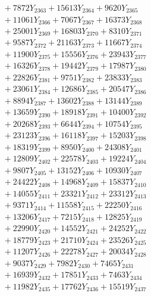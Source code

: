 \documentclass[a4paper,10pt]{article}
\begin{document}
{\begin{align}
&\;  + 7872 Y_{2363} + 15613 Y_{2364} + 9620 Y_{2365} \\[0.3ex]
&\;  + 11061 Y_{2366} + 7067 Y_{2367} + 16373 Y_{2368} \\[0.5ex]\allowbreak
&\;  + 25001 Y_{2369} + 16803 Y_{2370} + 8310 Y_{2371} \\[0.3ex]
&\;  + 9587 Y_{2372} + 21163 Y_{2373} + 11667 Y_{2374} \\[0.3ex]
&\;  + 11900 Y_{2375} + 15556 Y_{2376} + 23943 Y_{2377} \\[0.3ex]
&\;  + 16326 Y_{2378} + 19442 Y_{2379} + 17987 Y_{2380} \\[0.3ex]
&\;  + 22826 Y_{2381} + 9751 Y_{2382} + 23833 Y_{2383} \\[0.3ex]
&\;  + 23061 Y_{2384} + 12686 Y_{2385} + 20547 Y_{2386} \\[0.3ex]
&\;  + 8894 Y_{2387} + 13602 Y_{2388} + 13144 Y_{2389} \\[0.3ex]
&\;  + 13659 Y_{2390} + 18918 Y_{2391} + 10400 Y_{2392} \\[0.3ex]
&\;  + 20268 Y_{2393} + 6644 Y_{2394} + 10754 Y_{2395} \\[0.3ex]
&\;  + 23123 Y_{2396} + 16118 Y_{2397} + 15203 Y_{2398} \\[0.5ex]\allowbreak
&\;  + 18319 Y_{2399} + 8950 Y_{2400} + 24308 Y_{2401} \\[0.3ex]
&\;  + 12809 Y_{2402} + 22578 Y_{2403} + 19224 Y_{2404} \\[0.3ex]
&\;  + 9807 Y_{2405} + 13152 Y_{2406} + 10930 Y_{2407} \\[0.3ex]
&\;  + 24422 Y_{2408} + 14968 Y_{2409} + 15837 Y_{2410} \\[0.3ex]
&\;  + 14055 Y_{2411} + 23321 Y_{2412} + 23312 Y_{2413} \\[0.3ex]
&\;  + 9371 Y_{2414} + 11558 Y_{2415} + 22250 Y_{2416} \\[0.3ex]
&\;  + 13206 Y_{2417} + 7215 Y_{2418} + 12825 Y_{2419} \\[0.3ex]
&\;  + 22990 Y_{2420} + 14552 Y_{2421} + 24252 Y_{2422} \\[0.3ex]
&\;  + 18779 Y_{2423} + 21710 Y_{2424} + 23526 Y_{2425} \\[0.3ex]
&\;  + 11207 Y_{2426} + 22278 Y_{2427} + 20034 Y_{2428} \\[0.5ex]\allowbreak
&\;  + 9037 Y_{2429} + 7982 Y_{2430} + 7465 Y_{2431} \\[0.3ex]
&\;  + 16939 Y_{2432} + 17851 Y_{2433} + 7463 Y_{2434} \\[0.3ex]
&\;  + 11982 Y_{2435} + 17762 Y_{2436} + 15519 Y_{2437} \\[0.3ex]

\end{align}}
\end{document}
